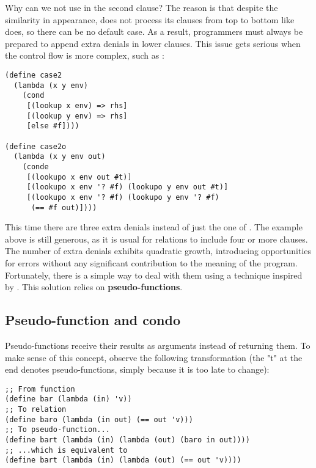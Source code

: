 Why can we not use  in the second clause? The reason is that despite the similarity in appearance,  does not process its clauses from top to bottom like  does, so there can be no default case. As a result, programmers must always be prepared to append extra denials in lower  clauses. This issue gets serious when the control flow is more complex, such as :

\begin{lstlisting}
(define case2
  (lambda (x y env)
    (cond
     [(lookup x env) => rhs]
     [(lookup y env) => rhs]
     [else #f])))

(define case2o
  (lambda (x y env out)
    (conde
     [(lookupo x env out #t)]
     [(lookupo x env '? #f) (lookupo y env out #t)]
     [(lookupo x env '? #f) (lookupo y env '? #f)
      (== #f out)])))
\end{lstlisting}

This time there are three extra denials instead of just the one of . The example above is still generous, as it is usual for relations to include four or more  clauses. The number of extra denials exhibits quadratic growth, introducing opportunities for errors without any significant contribution to the meaning of the program. Fortunately, there is a simple way to deal with them using a technique inspired by \textcite{reif}. This solution relies on \textbf{pseudo-functions}.

\subsection{Pseudo-function and condo}
Pseudo-functions receive their results as arguments instead of returning them. To make sense of this concept, observe the following transformation (the "t" at the end denotes pseudo-functions, simply because it is too late to change):
\begin{lstlisting}
;; From function
(define bar (lambda (in) 'v))
;; To relation
(define baro (lambda (in out) (== out 'v)))
;; To pseudo-function...
(define bart (lambda (in) (lambda (out) (baro in out))))
;; ...which is equivalent to
(define bart (lambda (in) (lambda (out) (== out 'v))))
\end{lstlisting}

